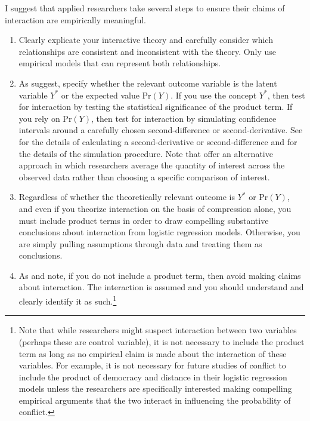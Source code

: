 \documentclass[12pt]{article}
\begin{document}
I suggest that applied researchers take several steps to ensure their claims of interaction are empirically meaningful.
\singlespace\vspace{-3mm}
\begin{enumerate}
\item Clearly explicate your interactive theory \citep{ClarkGilliganGolder2006, BerryGolderMilton2012} and carefully consider which relationships are consistent and inconsistent with the theory. Only use empirical models that can represent both relationships.
\item As \cite{BerryDeMerittEsarey2010} suggest, specify whether the relevant outcome variable is the latent variable $Y^*$ or the expected value $\text{Pr}(Y)$. If you use the concept $Y^*$, then test for interaction by testing the statistical significance of the product term. If you rely on $\text{Pr}(Y)$, then test for interaction by simulating confidence intervals around a carefully chosen second-difference or second-derivative. See \cite{BerryDeMerittEsarey2010} for the details of calculating a second-derivative or second-difference and \cite{KingTomzWhittenburg2000} for the details of the simulation procedure. Note that \cite{HanmerKalkan2013} offer an alternative approach in which researchers average the quantity of interest across the observed data rather than choosing a specific comparison of interest.
\item Regardless of whether the theoretically relevant outcome is $Y^*$ or $\text{Pr}(Y)$, and even if you theorize interaction on the basis of compression alone, you  must include product terms in order to draw compelling substantive conclusions about interaction from logistic regression models. Otherwise, you are simply pulling assumptions through data and treating them as conclusions.
\item As \cite{Nagler1991} and \cite{Frant1991} note, if you do not include a product term, then avoid making claims about interaction. The interaction is assumed and you should understand and clearly identify it as such.\footnote{Note that while researchers might suspect interaction between two variables (perhaps these are control variable), it is not necessary to include the product term as long as no empirical claim is made about the interaction of these variables. For example, it is not necessary for future studies of conflict to include the product of democracy and distance in their logistic regression models unless the researchers are specifically interested making compelling empirical arguments that the two interact in influencing the probability of conflict.}
\end{enumerate}
\doublespace
\end{document}

